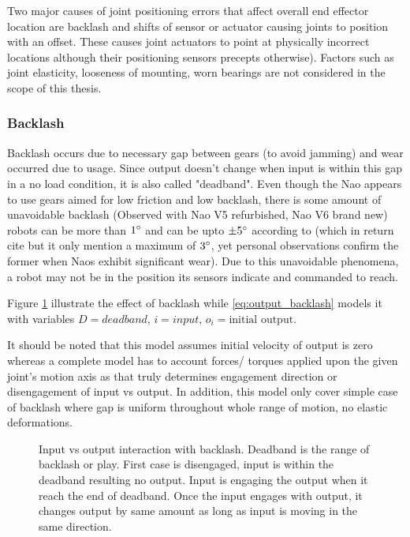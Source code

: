 \documentclass[english, printversion, nomenclature, notitle]{tuvisionthesis} %
\begin{document}
Two major causes of joint positioning errors that affect overall end effector location are backlash and shifts of sensor or actuator causing joints to position with an offset. These causes joint actuators to point at physically incorrect locations although their positioning sensors precepts otherwise). Factors such as joint elasticity, looseness of mounting, worn bearings are not considered in the scope of this thesis.

\subsubsection{Backlash}
\label{subsec:backlash}
Backlash occurs due to necessary gap between gears (to avoid jamming) and wear occurred due to usage. Since output doesn't change when input is within this gap in a no load condition, it is also called "deadband". Even though the Nao appears to use gears aimed for low friction and low backlash, there is some amount of unavoidable backlash (Observed with Nao V5 refurbished, Nao V6 brand new) robots can be more than $1\degree$ and can be upto $\pm 5\degree$ according to \cite{kastner_automatic_2015} (which in return cite \cite{gouaillier_nao_2008} but it only mention a maximum of $3\degree$, yet personal observations confirm the former when Naos exhibit significant wear). Due to this unavoidable phenomena, a robot may not be in the position its sensors indicate and commanded to reach.

Figure \ref{fig:backlash} illustrate the effect of backlash while \cref{eq:output_backlash} models it with variables $D = deadband$, $i = input$, $o_i = \text{initial output}$. 

It should be noted that this model assumes initial velocity of output is zero whereas a complete model has to account forces/ torques applied upon the given joint's motion axis as that truly determines engagement direction or disengagement of input vs output. In addition, this model only cover simple case of backlash where gap is uniform throughout whole range of motion, no elastic deformations.

\begin{figure}
	\def\svgwidth{\linewidth}
	
	\caption{Input vs output interaction with backlash. Deadband is the range of backlash or play. First case is disengaged, input is within the deadband resulting no output. Input is engaging the output when it reach the end of deadband. Once the input engages with output, it changes output by same amount as long as input is moving in the same direction.}
	\label{fig:backlash}
\end{figure}
\end{document}
